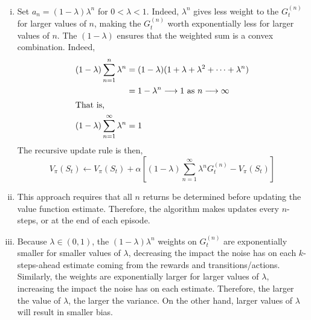 \documentclass[twoside,11pt]{homework}
\DeclarePairedDelimiter{\2norm}{\lVert}{\rVert^2_2}
\newcommand{\1}[1]{\mathds{1}\left[#1\right]}
\begin{document}
\begin{enumerate}[i)]
\item Set $a_n = (1 - \lambda)\lambda^n$ for $0 < \lambda < 1$. Indeed, $\lambda^n$ gives less weight to the $G_t^{(n)}$ for larger values of $n$, making the $G_t^{(n)}$ worth exponentially less for larger values of $n$. The $(1 - \lambda)$ ensures that the weighted sum is a convex combination. Indeed, 
\begin{align*}
(1 - \lambda)\sum_{n=1}^{n}\lambda^n & = (1 - \lambda)(1 + \lambda + \lambda^2 + \cdots + \lambda^n)\\
& = 1 - \lambda^n \longrightarrow 1 \ \text{as} \ n \longrightarrow \infty \\
\intertext{That is,} 
(1 - \lambda)\sum_{n=1}^{\infty}\lambda^n & = 1
\end{align*}
The recursive update rule is then,
$$V_{\pi}(S_t) \longleftarrow V_{\pi}(S_t) + \alpha\left[(1 - \lambda)\sum_{n=1}^{\infty}\lambda^n G_t^{(n)}  - V_{\pi}(S_t)\right]$$

\item This approach requires that all $n$ returns be determined before updating the value function estimate. Therefore, the algorithm makes updates every $n$-steps, or at the end of each episode.


\item Because $\lambda \in (0, 1)$,  the $(1-\lambda)\lambda^n$ weights on $G_t^{(n)}$ are exponentially smaller for smaller values of $\lambda$, decreasing the impact the noise has on each $k$-steps-ahead estimate coming from the rewards and transitions/actions. Similarly, the weights are exponentially larger for larger values of $\lambda$, increasing the impact the noise has on each estimate. Therefore, the larger the value of $\lambda$, the larger the variance. On the other hand, larger values of $\lambda$ will result in smaller bias. 

\end{enumerate}
\end{document}
